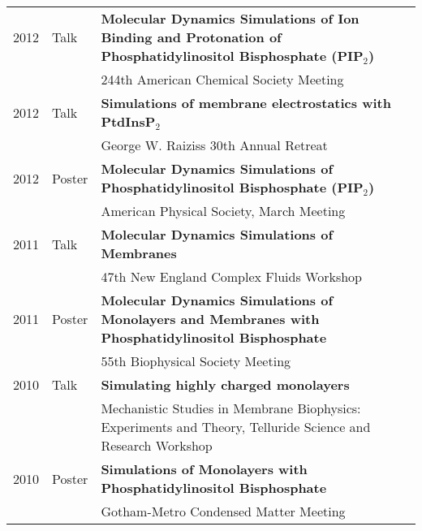 \documentclass[letterpaper,11pt]{article}
\begin{document}
\begin{tabular}{ll p{14 cm}}
2012 & Talk & \textbf{Molecular Dynamics Simulations of Ion Binding and Protonation of 
Phosphatidylinositol Bisphosphate (PIP$_2$)} \\
     && 244th American Chemical Society Meeting \\
2012 & Talk & \textbf{Simulations of membrane electrostatics with PtdInsP$_2$}\\
     && George W. Raiziss 30th Annual Retreat \\
2012 & Poster & \textbf{Molecular Dynamics Simulations of Phosphatidylinositol Bisphosphate (PIP$_2$)}\\
     && American Physical Society, March Meeting\\
2011 & Talk & \textbf{Molecular Dynamics Simulations of Membranes}\\
     && 47th New England Complex Fluids Workshop \\
2011 & Poster & \textbf{Molecular Dynamics Simulations of Monolayers and Membranes with Phosphatidylinositol Bisphosphate} \\
     && 55th Biophysical Society Meeting\\
2010 & Talk & \textbf{Simulating highly charged monolayers}\\
     && Mechanistic Studies in Membrane Biophysics: Experiments and Theory, 
Telluride Science and Research Workshop\\
2010 & Poster & \textbf{Simulations of Monolayers with Phosphatidylinositol Bisphosphate}\\
     && Gotham-Metro Condensed Matter Meeting\\

\end{tabular}
\end{document}
